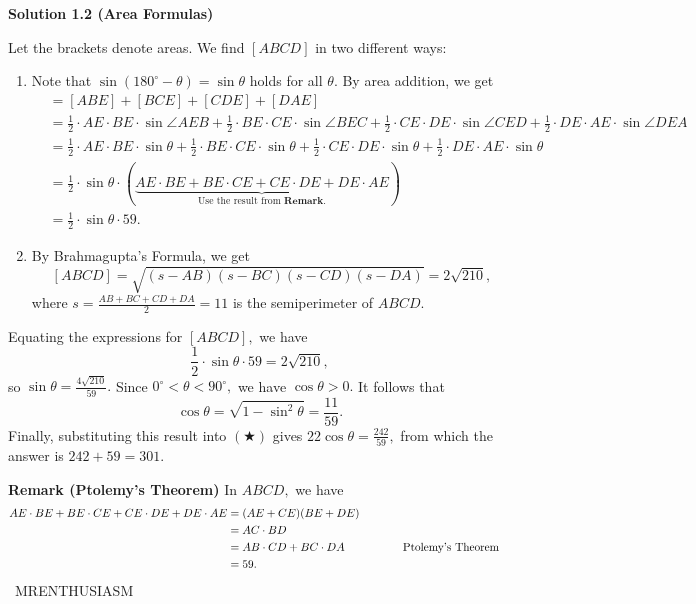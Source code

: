 \begin{enumerate}
\textbf{Solution 1.2 (Area Formulas)}

Let the brackets denote areas. We find $[ABCD]$ in two different ways:

 
            \begin{enumerate} 
        \item Note that $\sin(180^\circ-\theta)=\sin\theta$ holds for all $\theta.$ By area addition, we get
 \begin{align*} [ABCD]&=[ABE]+[BCE]+[CDE]+[DAE] \\ &=\frac12\cdot AE\cdot BE\cdot\sin\angle AEB+\frac12\cdot BE\cdot CE\cdot\sin\angle BEC+\frac12\cdot CE\cdot DE\cdot\sin\angle CED+\frac12\cdot DE\cdot AE\cdot\sin\angle DEA \\ &=\frac12\cdot AE\cdot BE\cdot\sin\theta+\frac12\cdot BE\cdot CE\cdot\sin\theta+\frac12\cdot CE\cdot DE\cdot\sin\theta+\frac12\cdot DE\cdot AE\cdot\sin\theta \\ &=\frac12\cdot\sin\theta\cdot(\phantom{ }\underbrace{AE\cdot BE+BE\cdot CE+CE\cdot DE+DE\cdot AE}_{\text{Use the result from }\textbf{Remark}\text{.}}\phantom{ }) \\ &=\frac12\cdot\sin\theta\cdot59. \end{align*}


        \item By Brahmagupta's Formula, we get 
 \[[ABCD]=\sqrt{(s-AB)(s-BC)(s-CD)(s-DA)}=2\sqrt{210},\] where $s=\frac{AB+BC+CD+DA}{2}=11$ is the semiperimeter of $ABCD.$

            \end{enumerate}
            Equating the expressions for $[ABCD],$ we have
 \[\frac12\cdot\sin\theta\cdot59=2\sqrt{210},\] so $\sin\theta=\frac{4\sqrt{210}}{59}.$ Since $0^\circ<\theta<90^\circ,$ we have $\cos\theta>0.$ It follows that 
 \[\cos\theta=\sqrt{1-\sin^2\theta}=\frac{11}{59}.\]Finally, substituting this result into $(\bigstar)$ gives $22\cos\theta=\frac{242}{59},$ from which the answer is $242+59=\boxed{301}.$

 \textbf{Remark (Ptolemy's Theorem)} In $ABCD,$ we have
 \begin{align*} AE\cdot BE+BE\cdot CE+CE\cdot DE+DE\cdot AE &= (AE+CE)(BE+DE) \\ &=AC\cdot BD \\ &=AB\cdot CD+BC\cdot DA &&\hspace{10mm}\text{Ptolemy's Theorem} \\ &=59. \end{align*}
~MRENTHUSIASM


\end{enumerate}
